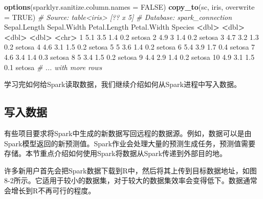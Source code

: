 \documentclass[
]{article}
\newenvironment{Shaded}{\begin{snugshade}}{\end{snugshade}}
\newcommand{\CommentTok}[1]{\textcolor[rgb]{0.56,0.35,0.01}{\textit{#1}}}
\newcommand{\DataTypeTok}[1]{\textcolor[rgb]{0.13,0.29,0.53}{#1}}
\newcommand{\DecValTok}[1]{\textcolor[rgb]{0.00,0.00,0.81}{#1}}
\newcommand{\ErrorTok}[1]{\textcolor[rgb]{0.64,0.00,0.00}{\textbf{#1}}}
\newcommand{\FloatTok}[1]{\textcolor[rgb]{0.00,0.00,0.81}{#1}}
\newcommand{\KeywordTok}[1]{\textcolor[rgb]{0.13,0.29,0.53}{\textbf{#1}}}
\newcommand{\NormalTok}[1]{#1}
\newcommand{\OperatorTok}[1]{\textcolor[rgb]{0.81,0.36,0.00}{\textbf{#1}}}
\newcommand{\OtherTok}[1]{\textcolor[rgb]{0.56,0.35,0.01}{#1}}
\newcommand{\StringTok}[1]{\textcolor[rgb]{0.31,0.60,0.02}{#1}}
\begin{document}
\begin{Shaded}
\begin{Highlighting}[]
\KeywordTok{options}\NormalTok{(}\DataTypeTok{sparklyr.sanitize.column.names =} \OtherTok{FALSE}\NormalTok{)}
\KeywordTok{copy_to}\NormalTok{(sc, iris, }\DataTypeTok{overwrite =} \OtherTok{TRUE}\NormalTok{)}
\CommentTok{# Source: table<iris> [?? x 5]}
\CommentTok{# Database: spark_connection}
\NormalTok{ Sepal.Length Sepal.Width Petal.Length Petal.Width Species}
 \OperatorTok{<}\NormalTok{dbl}\OperatorTok{>}\StringTok{ }\ErrorTok{<}\NormalTok{dbl}\OperatorTok{>}\StringTok{ }\ErrorTok{<}\NormalTok{dbl}\OperatorTok{>}\StringTok{ }\ErrorTok{<}\NormalTok{dbl}\OperatorTok{>}\StringTok{ }\ErrorTok{<}\NormalTok{chr}\OperatorTok{>}
\StringTok{ }\DecValTok{1} \FloatTok{5.1} \FloatTok{3.5} \FloatTok{1.4} \FloatTok{0.2}\NormalTok{ setosa}
 \DecValTok{2} \FloatTok{4.9} \DecValTok{3} \FloatTok{1.4} \FloatTok{0.2}\NormalTok{ setosa}
 \DecValTok{3} \FloatTok{4.7} \FloatTok{3.2} \FloatTok{1.3} \FloatTok{0.2}\NormalTok{ setosa}
 \DecValTok{4} \FloatTok{4.6} \FloatTok{3.1} \FloatTok{1.5} \FloatTok{0.2}\NormalTok{ setosa}
 \DecValTok{5} \DecValTok{5} \FloatTok{3.6} \FloatTok{1.4} \FloatTok{0.2}\NormalTok{ setosa}
 \DecValTok{6} \FloatTok{5.4} \FloatTok{3.9} \FloatTok{1.7} \FloatTok{0.4}\NormalTok{ setosa}
 \DecValTok{7} \FloatTok{4.6} \FloatTok{3.4} \FloatTok{1.4} \FloatTok{0.3}\NormalTok{ setosa}
 \DecValTok{8} \DecValTok{5} \FloatTok{3.4} \FloatTok{1.5} \FloatTok{0.2}\NormalTok{ setosa}
 \DecValTok{9} \FloatTok{4.4} \FloatTok{2.9} \FloatTok{1.4} \FloatTok{0.2}\NormalTok{ setosa}
\DecValTok{10} \FloatTok{4.9} \FloatTok{3.1} \FloatTok{1.5} \FloatTok{0.1}\NormalTok{ setosa}
\CommentTok{# ... with more rows}
\end{Highlighting}
\end{Shaded}

学习完如何给Spark读取数据，我们继续介绍如何从Spark进程中写入数据。

\hypertarget{ux5199ux5165ux6570ux636e}{%
\subsection{写入数据}\label{ux5199ux5165ux6570ux636e}}

有些项目要求将Spark中生成的新数据写回远程的数据源。例如，数据可以是由Spark模型返回的新预测值。Spark作业会处理大量的预测生成任务，预测值需要存储。本节重点介绍如何使用Spark将数据从Spark传递到外部目的地。

许多新用户首先会把Spark数据下载到R中，然后将其上传到目标数据地址，如图8-2所示。它适用于较小的数据集，对于较大的数据集效率会变得低下。数据通常会增长到R不再可行的程度。
\end{document}
